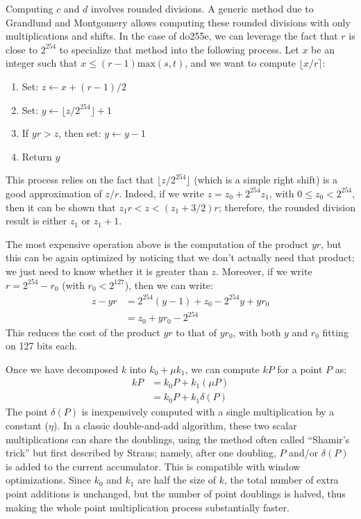 \documentclass{llncs}
\begin{document}
Computing $c$ and $d$ involves rounded divisions. A generic method due
to Grandlund and Montgomery\cite{GraMon1994} allows computing these
rounded divisions with only multiplications and shifts. In the case of
do255e, we can leverage the fact that $r$ is close to $2^{254}$ to
specialize that method into the following process. Let $x$ be an integer
such that $x\leq (r-1)\text{max}(s, t)$, and we want to compute $\lfloor
x/r \rceil$:
\begin{enumerate}
    \item Set: $z \leftarrow x + (r-1)/2$
    \item Set: $y \leftarrow \lfloor z / 2^{254} \rfloor + 1$
    \item If $yr > z$, then set: $y \leftarrow y-1$
    \item Return $y$
\end{enumerate}
This process relies on the fact that $\lfloor z / 2^{254}\rfloor$ (which
is a simple right shift) is a good approximation of $z/r$. Indeed, if
we write $z = z_0 + 2^{254} z_1$, with $0\leq z_0 < 2^{254}$, then
it can be shown that $z_1 r < z < (z_1 + 3/2)r$; therefore, the rounded
division result is either $z_1$ or $z_1 + 1$.

The most expensive operation above is the computation of the product
$yr$, but this can be again optimized by noticing that we don't actually
need that product; we just need to know whether it is greater than $z$.
Moreover, if we write $r = 2^{254} - r_0$ (with $r_0 < 2^{127}$), then
we can write:
\begin{align*}
    z - yr &= 2^{254}(y - 1) + z_0 - 2^{254} y + y r_0 \\
           &= z_0 + y r_0 - 2^{254}
\end{align*}
This reduces the cost of the product $y r$ to that of $y r_0$, with
both $y$ and $r_0$ fitting on 127 bits each.

Once we have decomposed $k$ into $k_0 + \mu k_1$, we can compute
$kP$ for a point $P$ as:
\begin{align*}
    k P &= k_0 P + k_1 (\mu P) \\
        &= k_0 P + k_1 \delta(P)
\end{align*}
The point $\delta(P)$ is inexpensively computed with a single
multiplication by a constant ($\eta$). In a classic double-and-add
algorithm, these two scalar multiplications can share the doublings,
using the method often called ``Shamir's trick'' but first described by
Straus\cite{Str1964}; namely, after one doubling, $P$ and/or $\delta(P)$
is added to the current accumulator. This is compatible with window
optimizations. Since $k_0$ and $k_1$ are half the size of $k$, the total
number of extra point additions is unchanged, but the number of point
doublings is halved, thus making the whole point multiplication process
substantially faster.
\end{document}
